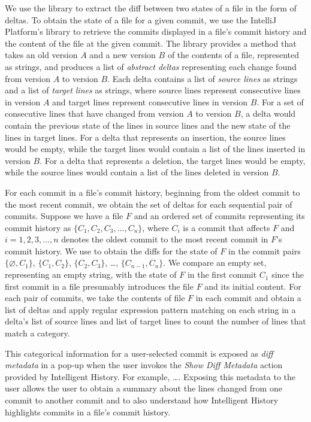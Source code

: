 We use the  \cite{java-diff-utils} library to extract the diff between two states of a file in the form of deltas. 
To obtain the state of a file for a given commit, we use the IntelliJ Platform's  library to retrieve the commits displayed in a file's commit history and the content of the file at the given commit.
The  library provides a method that takes an old version $A$ and a new version $B$ of the contents of a file, represented as strings, and produces a list of \emph{abstract deltas} representing each change found from version $A$ to version $B$. 
Each delta contains a list of \emph{source lines} as strings and a list of \emph{target lines} as strings, where source lines represent consecutive lines in version $A$ and target lines represent consecutive lines in version $B$. 
For a set of consecutive lines that have changed from version $A$ to version $B$, a delta would contain the previous state of the lines in source lines and the new state of the lines in target lines.
For a delta that represents an insertion, the source lines would be empty, while the target lines would contain a list of the lines inserted in version $B$.
For a delta that represents a deletion, the target lines would be empty, while the source lines would contain a list of the lines deleted in version $B$.

For each commit in a file's commit history, beginning from the oldest commit to the most recent commit, we obtain the set of deltas for each sequential pair of commits.
Suppose we have a file $F$ and an ordered set of commits representing its commit history as $\{C_{1}, C_{2}, C_{3}, \dots, C_{n}\}$, where $C_{i}$ is a commit that affects $F$ and $i = 1, 2, 3, \dots, n$ denotes the oldest commit to the most recent commit in $F$'s commit history.
We use  to obtain the diffs for the state of $F$ in the commit pairs $\{\varnothing, C_{1}\}$, $\{C_{1}, C_{2}\}$, $\{C_{2}, C_{3}\}$, \dots, $\{C_{n-1}, C_{n}\}$.
We compare an empty set, representing an empty string, with the state of $F$ in the first commit $C_{1}$ since the first commit in a file presumably introduces the file $F$ and its initial content.
For each pair of commits, we take the contents of file $F$ in each commit and  obtain a list of deltas and apply regular expression pattern matching on each string in a delta's list of source lines and list of target lines to count the number of lines that match a category.

This categorical information for a user-selected commit is exposed as \emph{diff metadata} in a pop-up when the user invokes the \textit{Show Diff Metadata} action provided by Intelligent History.
For example, \dots {}.
Exposing this metadata to the user allows the user to obtain a summary about the lines changed from one commit to another commit and to also understand how Intelligent History highlights commits in a file's commit history.

